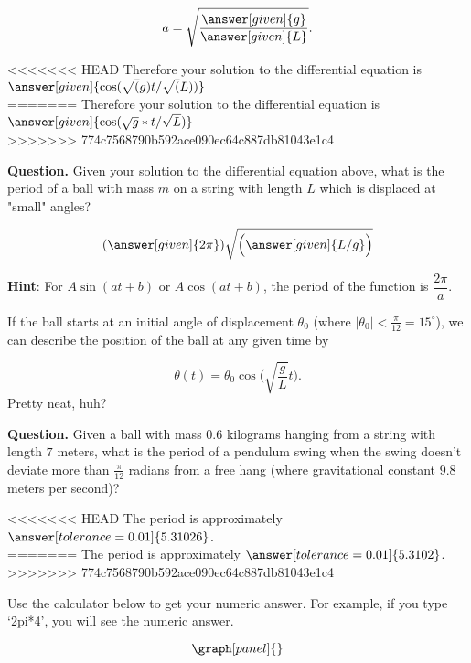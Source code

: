 \documentclass[handout,nooutcomes]{ximera}
\begin{document}
\begin{example}
\begin{explanation}
\[
a = \sqrt{\dfrac{\answer[given]{g}}{\answer[given]{L}}}.
\]

<<<<<<< HEAD
Therefore your solution to the differential equation is $\answer[given]{ \cos(\sqrt(g)t/\sqrt(L))}$\\
=======
Therefore your solution to the differential equation is $\answer[given]{ \cos(\sqrt{g}*t/\sqrt{L})}$\\
>>>>>>> 774c7568790b592ace090ec64c887db81043e1c4



\textbf{Question. } Given your solution to the differential equation above, what is the period of a ball with mass $m$ on a string with length $L$ which is displaced at "small" angles?

\[
(\answer[given]{2\pi})\sqrt{\Big(\answer[given]{L/g}\Big)}
\]
\medskip

\textbf{Hint}: For $A\sin(at+b)$ or $A\cos(at+b)$, the period of the 
function is $\dfrac{2\pi}{a}$.


If the ball starts at an initial angle of displacement $\theta_0$
(where $|\theta_0|<\frac{\pi}{12}= 15^\circ$), we can describe
the position of the ball at any given time by

\[
\theta(t) = \theta_0 \cos\Big(\sqrt{\frac{g}{L}} t\Big).
\]
Pretty neat, huh?


\textbf{Question. } Given a ball with mass $0.6$ kilograms hanging from a string with length $7$ meters, what is the period of a pendulum swing when the swing doesn't deviate more than $\frac{\pi}{12}$ radians from a free hang (where gravitational constant $9.8$ meters per second)?


<<<<<<< HEAD
The period is approximately $\answer[tolerance=0.01]{5.31026}$.\\
=======
The period is approximately $\answer[tolerance=0.01]{5.3102}$.\\
>>>>>>> 774c7568790b592ace090ec64c887db81043e1c4

Use the calculator below to get your numeric answer. For example, if you type
`2pi*4', you will see the numeric answer.

\[
\graph[panel]{}
\]


\end{explanation}
\end{example}
\end{document}
